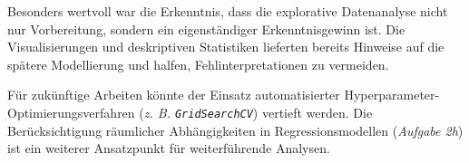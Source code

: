 Besonders wertvoll war die Erkenntnis, dass die explorative Datenanalyse nicht nur Vorbereitung, sondern ein eigenständiger Erkenntnisgewinn ist. Die Visualisierungen und deskriptiven Statistiken lieferten bereits Hinweise auf die spätere Modellierung und halfen, Fehlinterpretationen zu vermeiden.

Für zukünftige Arbeiten könnte der Einsatz automatisierter Hyperparameter-\\Optimierungsverfahren (\textit{\acs{z. B.} \texttt{GridSearchCV}}) vertieft werden. Die Berücksichtigung räumlicher Abhängigkeiten in Regressionsmodellen (\textit{Aufgabe 2h}) ist ein weiterer Ansatzpunkt für weiterführende Analysen.

